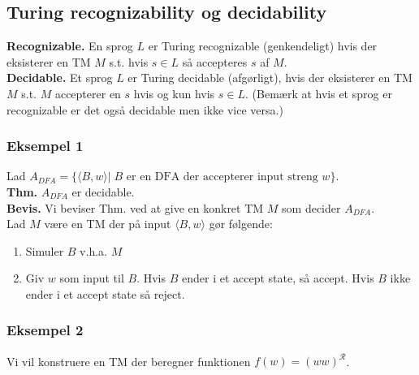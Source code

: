 \subsection*{Turing recognizability og decidability}

\textbf{Recognizable.} En sprog $L$ er Turing recognizable (genkendeligt) hvis der eksisterer en TM $M$ s.t. hvis $s \in L$ så accepteres $s$ af $M$. \\ 

\textbf{Decidable.} Et sprog $L$ er Turing decidable (afgørligt), hvis der eksisterer en TM $M$ s.t. $M$ accepterer en $s$ hvis og kun hvis $s \in L$. (Bemærk at hvis et sprog er recognizable er det også decidable men ikke vice versa.)\\

\subsubsection*{Eksempel 1} %

Lad $A_{DFA} =\{\langle B,w \rangle| \; B \text{ er en DFA der accepterer input streng } w\}$. \\

\textbf{Thm.} $A_{DFA}$ er decidable. \\

\textbf{Bevis.} Vi beviser Thm. ved at give en konkret TM $M$ som decider $A_{DFA}$. \\

Lad $M$ være en TM der på input $\langle B, w \rangle$ gør følgende: 
\begin{enumerate}
	\item Simuler $B$ v.h.a. $M$
	\item Giv $w$ som input til $B$. Hvis $B$ ender i et accept state, så accept. Hvis $B$ ikke ender i et accept state så reject. 
\end{enumerate}

\subsubsection*{Eksempel 2}

Vi vil konstruere en TM der beregner funktionen $f(w)=(ww)^{\mathcal{R}}$. \\

